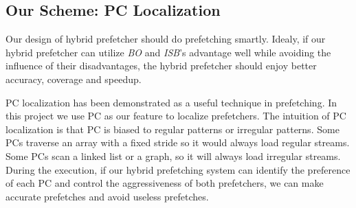 \subsection{Our Scheme: PC Localization}
  \label{sec:goal}
  Our design of hybrid prefetcher should do prefetching smartly. Idealy, if our hybrid prefetcher can utilize \emph{BO} and \emph{ISB}'s advantage well while avoiding the influence of their disadvantages, the hybrid prefetcher should enjoy better accuracy, coverage and speedup. \par
  PC localization has been demonstrated as a useful technique in prefetching\cite{isbpaper, ghbpaper, shippaper}. In this project we use PC as our feature to localize prefetchers. The intuition of PC localization is that PC is biased to regular patterns or irregular patterns.
  Some PCs traverse an array with a fixed stride so it would always load regular streams. Some PCs scan a linked list or a graph, so it will always load irregular streams.
  During the execution, if our hybrid prefetching system can identify the preference of each PC and control the aggressiveness of both prefetchers, we can make accurate prefetches and avoid useless prefetches. \par
  
  
